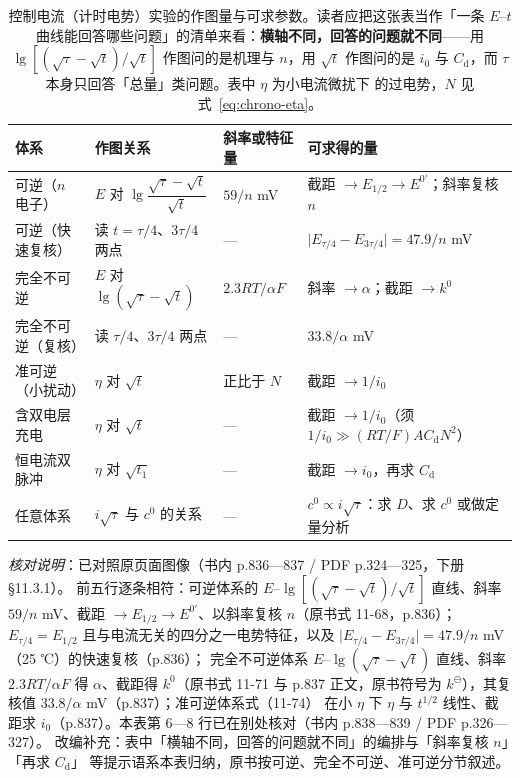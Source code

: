 \begin{table}[htbp]
\centering
\caption{控制电流（计时电势）实验的作图量与可求参数。读者应把这张表当作「一条 $E$–$t$
曲线能回答哪些问题」的清单来看：\textbf{横轴不同，回答的问题就不同}——用
$\lg[(\sqrt{\tau}-\sqrt{t})/\sqrt{t}]$ 作图问的是机理与 $n$，用 $\sqrt{t}$ 作图问的是
$i_0$ 与 $C_{\mathrm{d}}$，而 $\tau$ 本身只回答「总量」类问题。表中 $\eta$ 为小电流微扰下
的过电势，$N$ 见式~\eqref{eq:chrono-eta}。}
\label{tab:chrono-diagnostics}
\begin{tabularx}{\columnwidth}{@{}p{25mm}p{30mm}p{30mm}X@{}}
\toprule
体系 & 作图关系 & 斜率或特征量 & 可求得的量 \\
\midrule
可逆（$n$ 电子） & $E$ 对 $\lg\dfrac{\sqrt{\tau}-\sqrt{t}}{\sqrt{t}}$ & $59/n$ mV &
截距 $\to E_{1/2}\to E^{0'}$；斜率复核 $n$ \\
可逆（快速复核） & 读 $t=\tau/4$、$3\tau/4$ 两点 & --- &
$\lvert E_{\tau/4}-E_{3\tau/4}\rvert=47.9/n$ mV \\
完全不可逆 & $E$ 对 $\lg(\sqrt{\tau}-\sqrt{t})$ & $2.3RT/\alpha F$ &
斜率 $\to\alpha$；截距 $\to k^{0}$ \\
完全不可逆（复核） & 读 $\tau/4$、$3\tau/4$ 两点 & --- & $33.8/\alpha$ mV \\
准可逆（小扰动） & $\eta$ 对 $\sqrt{t}$ & 正比于 $N$ & 截距 $\to 1/i_0$ \\
含双电层充电 & $\eta$ 对 $\sqrt{t}$ & --- &
截距 $\to 1/i_0$（须 $1/i_0\gg(RT/F)AC_{\mathrm{d}}N^{2}$） \\
恒电流双脉冲 & $\eta$ 对 $\sqrt{t_1}$ & --- & 截距 $\to i_0$，再求 $C_{\mathrm{d}}$ \\
任意体系 & $i\sqrt{\tau}$ 与 $c^0$ 的关系 & --- &
$c^0\propto i\sqrt{\tau}$：求 $D$、求 $c^0$ 或做定量分析 \\
\bottomrule
\end{tabularx}

\end{table}

\emph{核对说明}：已对照原页面图像（书内 p.836—837 / PDF p.324—325，下册
§11.3.1）。
前五行逐条相符：可逆体系的 $E$–$\lg[(\sqrt{\tau}-\sqrt{t})/\sqrt{t}]$
直线、斜率 $59/n$ mV、截距 $\to E_{1/2}\to E^{0'}$、以斜率复核 $n$（原书式
11-68，p.836）；$E_{\tau/4}=E_{1/2}$ 且与电流无关的四分之一电势特征，以及 $\lvert
E_{\tau/4}-E_{3\tau/4}\rvert=47.9/n$ mV（25 ℃）的快速复核（p.836）；
完全不可逆体系 $E$–$\lg(\sqrt{\tau}-\sqrt{t})$ 直线、斜率 $2.3RT/\alpha
F$ 得 $\alpha$、截距得 $k^{0}$（原书式 11-71 与 p.837 正文，原书符号为
$k^{\ominus}$），其复核值 $33.8/\alpha$ mV（p.837）；准可逆体系式（11-74）
在小 $\eta$ 下 $\eta$ 与 $t^{1/2}$ 线性、截距求 $i_0$（p.837）。本表第
6—8 行已在别处核对（书内 p.838—839 / PDF p.326—327）。
改编补充：表中「横轴不同，回答的问题就不同」的编排与「斜率复核 $n$」「再求 $C_{\mathrm{d}}$」
等提示语系本表归纳，原书按可逆、完全不可逆、准可逆分节叙述。


